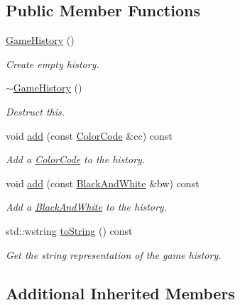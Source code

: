\subsection*{Public Member Functions}
\begin{DoxyCompactItemize}
\item 
\hyperlink{classmastermind_1_1logic_1_1_game_history_a4731c4c94790c94c5f5e72a5ef344602}{Game\+History} ()
\begin{DoxyCompactList}\small\item\em Create empty history. \end{DoxyCompactList}\item 
\hyperlink{classmastermind_1_1logic_1_1_game_history_a7f94763f41492e795201f000874ba9e1}{$\sim$\+Game\+History} ()
\begin{DoxyCompactList}\small\item\em Destruct this. \end{DoxyCompactList}\item 
void \hyperlink{classmastermind_1_1logic_1_1_game_history_abcf47c78a6e9be8faa4238f2bc45e5e7}{add} (const \hyperlink{classmastermind_1_1logic_1_1_color_code}{Color\+Code} \&cc) const
\begin{DoxyCompactList}\small\item\em Add a \hyperlink{classmastermind_1_1logic_1_1_color_code}{Color\+Code} to the history. \end{DoxyCompactList}\item 
void \hyperlink{classmastermind_1_1logic_1_1_game_history_a0d81e90269bca2588b857c1c8bf966b8}{add} (const \hyperlink{classmastermind_1_1logic_1_1_black_and_white}{Black\+And\+White} \&bw) const
\begin{DoxyCompactList}\small\item\em Add a \hyperlink{classmastermind_1_1logic_1_1_black_and_white}{Black\+And\+White} to the history. \end{DoxyCompactList}\item 
std\+::wstring \hyperlink{classmastermind_1_1logic_1_1_game_history_ae3795a9ab89a850bc3b1f36d3ba76756}{to\+String} () const
\begin{DoxyCompactList}\small\item\em Get the string representation of the game history. \end{DoxyCompactList}\end{DoxyCompactItemize}
\subsection*{Additional Inherited Members}


